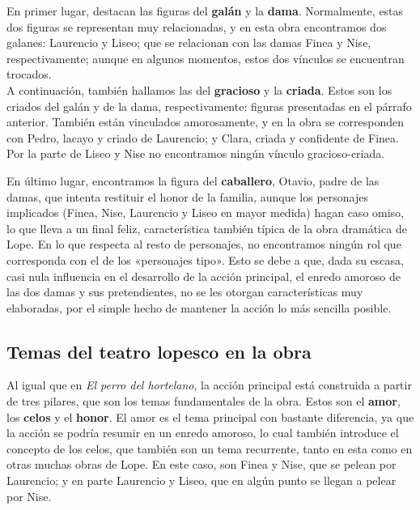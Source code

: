 \documentclass[12pt,a4paper]{article}
\begin{document}
En primer lugar, destacan las figuras del \textbf{galán} y la \textbf{dama}. Normalmente, estas dos figuras se representan muy relacionadas, y en esta obra encontramos dos galanes: Laurencio y Liseo; que se relacionan con las damas Finea y Nise, respectivamente; aunque en algunos momentos, estos dos vínculos se encuentran trocados.\\

A continuación, también hallamos las del \textbf{gracioso} y la \textbf{criada}. Estos son los criados del galán y de la dama, respectivamente: figuras presentadas en el párrafo anterior. También están vinculados amorosamente, y en la obra se corresponden con Pedro, lacayo y criado de Laurencio; y Clara, criada y confidente de Finea. Por la parte de Liseo y Nise no encontramos ningún vínculo gracioso-criada.\\


En último lugar, encontramos la figura del \textbf{caballero}, Otavio, padre de las damas, que intenta restituir el honor de la familia, aunque los personajes implicados (Finea, Nise, Laurencio y Liseo en mayor medida) hagan caso omiso, lo que lleva a un final feliz, característica también típica de la obra dramática de Lope. En lo que respecta al resto de personajes, no encontramos ningún rol que corresponda con el de los «personajes tipo». Esto se debe a que, dada su escasa, casi nula influencia en el desarrollo de la acción principal, el enredo amoroso de las dos damas y sus pretendientes, no se les otorgan características muy elaboradas, por el simple hecho de mantener la acción lo más sencilla posible.

\subsection{Temas del teatro lopesco en la obra}

Al igual que en \textit{El perro del hortelano}, la acción principal está construida a partir de tres pilares, que son los temas fundamentales de la obra. Estos son el \textbf{amor}, los \textbf{celos} y el \textbf{honor}. El amor es el tema principal con bastante diferencia, ya que la acción se podría resumir en un enredo amoroso, lo cual también introduce el concepto de los celos, que también son un tema recurrente, tanto en esta como en otras muchas obras de Lope. En este caso, son Finea y Nise, que se pelean por Laurencio; y en parte Laurencio y Liseo, que en algún punto se llegan a pelear por Nise.\\
\end{document}
